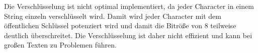 Die Verschlüsselung ist nicht optimal implementiert, da jeder Character in einem String einzeln verschlüsselt wird. Damit wird jeder Character mit dem öffentlichen Schlüssel potenziert wird und damit die Bitröße von 8 teilweise deutlich überschreitet. Die Verschlüsselung ist daher nicht effizient und kann bei großen Texten zu Problemen führen.
